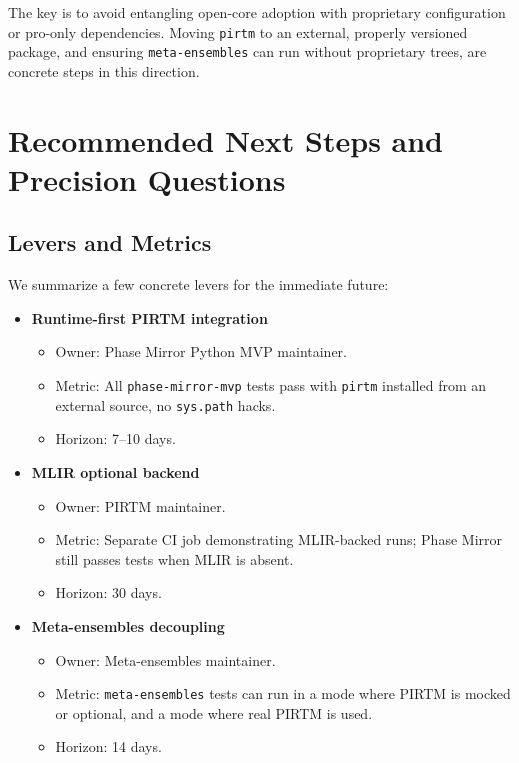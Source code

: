 \documentclass[11pt]{article}
\begin{document}
The key is to avoid entangling open-core adoption with proprietary configuration or pro-only dependencies. Moving \texttt{pirtm} to an external, properly versioned package, and ensuring \texttt{meta-ensembles} can run without proprietary trees, are concrete steps in this direction.

\section{Recommended Next Steps and Precision Questions}

\subsection{Levers and Metrics}

We summarize a few concrete levers for the immediate future:

\begin{itemize}
  \item \textbf{Runtime-first PIRTM integration}
    \begin{itemize}
      \item Owner: Phase Mirror Python MVP maintainer.
      \item Metric: All \texttt{phase-mirror-mvp} tests pass with \texttt{pirtm} installed from an external source, no \texttt{sys.path} hacks.
      \item Horizon: 7--10 days.
    \end{itemize}
  \item \textbf{MLIR optional backend}
    \begin{itemize}
      \item Owner: PIRTM maintainer.
      \item Metric: Separate CI job demonstrating MLIR-backed runs; Phase Mirror still passes tests when MLIR is absent.
      \item Horizon: 30 days.
    \end{itemize}
  \item \textbf{Meta-ensembles decoupling}
    \begin{itemize}
      \item Owner: Meta-ensembles maintainer.
      \item Metric: \texttt{meta-ensembles} tests can run in a mode where PIRTM is mocked or optional, and a mode where real PIRTM is used.
      \item Horizon: 14 days.
    \end{itemize}
\end{itemize}
\end{document}
